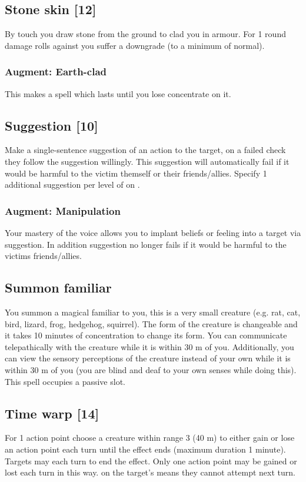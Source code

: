 \subsection{Stone skin [12]}
By touch you draw stone from the ground to clad you in armour. For 1 round damage rolls against you suffer a  downgrade (to a minimum of normal). 
\subsubsection{Augment: Earth-clad}
This makes  a  spell which lasts until you lose concentrate on it.

\subsection{Suggestion [10]}
Make a single-sentence suggestion of an action to the target, on a failed  check they follow the suggestion willingly. This suggestion will automatically fail if it would
be harmful to the victim themself or their friends/allies. Specify 1 additional suggestion per level of  on . 		
\subsubsection{Augment: Manipulation}
Your mastery of the voice allows you to implant beliefs or feeling into a target via suggestion. In addition suggestion no longer fails if it would be harmful to the victims friends/allies.

\subsection{Summon familiar}
\label{spell:familiar}
You summon a magical familiar to you, this is a very small creature (e.g. rat, cat, bird, lizard, frog, hedgehog, squirrel). The form of the creature is changeable and it takes 10 minutes of concentration to change its form. You can communicate telepathically with the creature while it is within 30 m of you. Additionally, you can view the sensory perceptions of the creature instead of your own while it is within 30 m of you (you are blind and deaf to your own senses while doing this). This spell occupies a passive  slot.

\subsection{Time warp [14]}
For 1 action point choose a creature within range 3 (40 m) to either gain or lose an action point each turn until the effect ends (maximum duration 1 minute). Targets may  each turn to end the effect. Only one action point may be gained or lost each turn in this way.  on the target's  means they cannot attempt  next turn.
